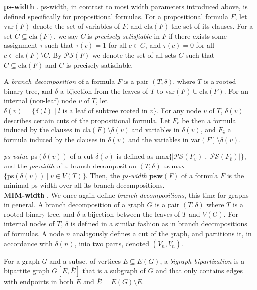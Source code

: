 \documentclass{article}
\begin{document}
\noindent
\textbf{ps-width} \cite{DBLP:conf/sat/SaetherTV14}.
ps-width, in contrast to most width parameters introduced above, is defined specifically for propositional formulas.
For a propositional formula $F$, let $\text{var}(F)$ denote the set of variables of $F$, and $\text{cla}(F)$ the set of its clauses.
For a set $C \subseteq \text{cla}(F)$, we say $C$ is {\em precisely satisfiable} in $F$ if there exists some assignment $\tau$ such that $\tau(c)=1$ for all $c\in C$, and $\tau(c)=0$ for all $c \in \text{cla}(F)\setminus C$.
By $\mathcal{PS}(F)$ we denote the set of all sets $C$ such that $C \subseteq \text{cla}(F)$ and $C$ is precisely satisfiable.


A {\em branch decomposition} of a formula $F$ is a pair $(T, \delta)$, where $T$ is a rooted binary tree, and $\delta$ a bijection from the leaves of $T$ to $\text{var}(F) \cup \text{cla}(F)$.
For an internal (non-leaf) node $v$ of $T$, let $\delta(v) = \{ \delta(l) \; | \; l \text{ is a leaf of subtree rooted in } v \}$.
For any node $v$ of $T$, $\delta(v)$ describes certain cuts of the propositional formula.
Let $F_v$ be then a formula induced by the clauses in cla$(F)\setminus \delta(v)$ and variables in $\delta(v)$, and $F_{\overline{v}}$ a formula induced by the clauses in $\delta(v)$ and the variables in var$(F)\setminus \delta(v)$.

{\em ps-value} ps$(\delta(v))$ of a cut $\delta(v)$ is defined as max$\{|\mathcal{PS}(F_v)|, |\mathcal{PS}(F_{\overline{v}})|\}$, and the {\em ps-width} of a branch decomposition $(T,\delta)$ as max$\{ \text{ps}(\delta(v)) \; | \; v \in V(T) \}$. 
Then, the {\em ps-width} $\mathbf{psw}(F)$ of a formula $F$ is the minimal ps-width over all its branch decompositions.\\

\noindent
\textbf{MIM-width} \cite{DBLP:conf/sat/SaetherTV14}.
We once again define {\em branch decompositions}, this time for graphs in general.
A branch decomposition of a graph $G$ is a pair $(T, \delta)$ where $T$ is a rooted binary tree, and $\delta$ a bijection between the leaves of $T$ and $V(G).$
For internal nodes of $T$, $\delta$ is defined in a similar fashion as in branch decompositions of formulas.
A node $n$ analogously defines a cut of the graph, and partitions it, in accordance with $\delta(n)$, into two parts, denoted $(V_n, \overline{V_n})$.

For a graph $G$ and a subset of vertices $E \subseteq E(G)$, a {\em bigraph bipartization} is a bipartite graph $G[E, \overline{E}]$ that is a subgraph of $G$ and that only contains edges with endpoints in both $E$ and $\overline{E} = E(G) \setminus E$.
\end{document}
